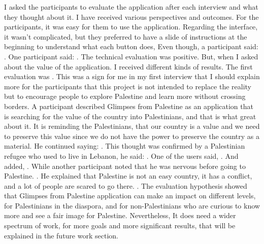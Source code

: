 I asked the participants to evaluate the application after each interview and what they thought about it. I have received various perspectives and outcomes. For the participants, it was easy for them to use the application. Regarding the interface, it wasn't complicated, but they preferred to have a slide of instructions at the beginning to understand what each button does, Even though, a participant said: . One participant said: . The technical evaluation was positive. But, when I asked about the value of the application. I received different kinds of results. The first evaluation was . This was a sign for me in my first interview that I should explain more for the participants that this project is not intended to replace the reality but to encourage people to explore Palestine and learn more without crossing borders. 
A participant described Glimpses from Palestine as an application that is searching for the value of the country into Palestinians, and that is what great about it. It is reminding the Palestinians, that our country is a value and we need to preserve this value since we do not have the power to preserve the country as a material.  He continued saying: . This thought was confirmed by a Palestinian refugee who used to live in Lebanon, he said: . One of the users said, . And added, . While another participant noted that he was nervous before going to Palestine. . He explained that Palestine is not an easy country, it has a conflict, and a lot of people are scared to go there. . 
The evaluation hypothesis showed that Glimpses from Palestine application can make an impact on different levels, for Palestinians in the diaspora, and for non-Palestinians who are curious to know more and see a fair image for Palestine. Nevertheless, It does need a wider spectrum of work, for more goals and more significant results, that will be explained in the future work section.
